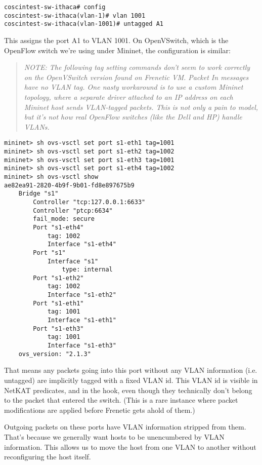 \begin{verbatim}
coscintest-sw-ithaca# config
coscintest-sw-ithaca(vlan-1)# vlan 1001
coscintest-sw-ithaca(vlan-1001)# untagged A1
\end{verbatim}

This assigns the port A1 to VLAN 1001.  On OpenVSwitch, which is the OpenFlow switch we're using under Mininet, 
the configuration is similar:

\begin{quotation}
\emph{NOTE: The following tag setting commands don't seem to work correctly on the OpenVSwitch version found on
Frenetic VM.  Packet In messages have no VLAN tag.  One nasty workaround is to use a custom Mininet 
topology, where a separate driver attached to an IP address on each Mininet host sends VLAN-tagged packets.
This is not only a pain to model, but it's not how real OpenFlow switches (like the Dell and HP) handle
VLANs.  }
\end{quotation}

\begin{verbatim}
mininet> sh ovs-vsctl set port s1-eth1 tag=1001
mininet> sh ovs-vsctl set port s1-eth2 tag=1002
mininet> sh ovs-vsctl set port s1-eth3 tag=1001
mininet> sh ovs-vsctl set port s1-eth4 tag=1002
mininet> sh ovs-vsctl show
ae82ea91-2820-4b9f-9b01-fd8e897675b9
    Bridge "s1"
        Controller "tcp:127.0.0.1:6633"
        Controller "ptcp:6634"
        fail_mode: secure
        Port "s1-eth4"
            tag: 1002
            Interface "s1-eth4"
        Port "s1"
            Interface "s1"
                type: internal
        Port "s1-eth2"
            tag: 1002
            Interface "s1-eth2"
        Port "s1-eth1"
            tag: 1001
            Interface "s1-eth1"
        Port "s1-eth3"
            tag: 1001
            Interface "s1-eth3"
    ovs_version: "2.1.3"
\end{verbatim}

That means any packets going into this port without any VLAN
information (i.e. untagged) are implicitly tagged with a fixed VLAN id.   This VLAN id is visible in NetKAT
predicates, and in the  hook, even though they technically don't belong to the 
packet that entered the switch.  (This is a rare instance where packet modifications are applied
before Frenetic gets ahold of them.)

Outgoing packets on these ports have VLAN information stripped from them.  That's because we generally 
want hosts to be unencumbered by VLAN information.  This allows us to move the host from one VLAN to another
without reconfiguring the host itself.  

